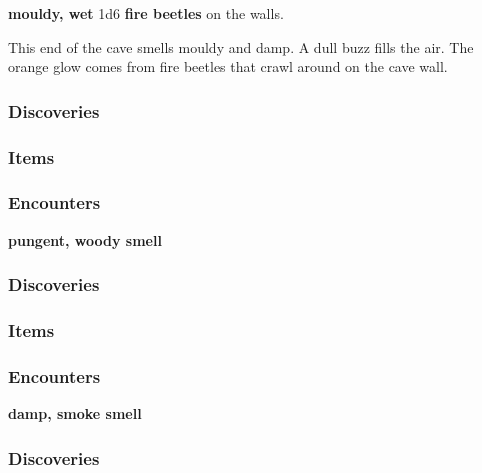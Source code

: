 \textbf{mouldy, wet}
1d6 \textbf{fire beetles} on the walls.
\begin{DndReadAloud}
    This end of the cave smells mouldy and damp. A dull buzz fills the air. The
    orange glow comes from fire beetles that crawl around on the cave wall.
\end{DndReadAloud}
\subsubsection{Discoveries}
\begin{itemize}
\end{itemize}
\subsubsection{Items}
\begin{itemize}
\end{itemize}
\subsubsection{Encounters}
\begin{itemize}
\end{itemize}

\textbf{pungent, woody smell}
\begin{DndReadAloud}
\end{DndReadAloud}
\subsubsection{Discoveries}
\begin{itemize}
\end{itemize}
\subsubsection{Items}
\begin{itemize}
\end{itemize}
\subsubsection{Encounters}
\begin{itemize}
\end{itemize}

\textbf{damp, smoke smell}
\begin{DndReadAloud}
\end{DndReadAloud}
\subsubsection{Discoveries}
\begin{itemize}
\end{itemize}
